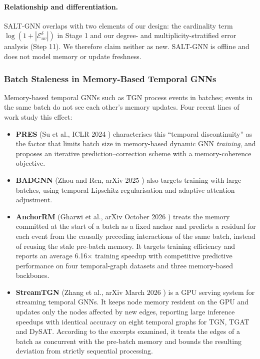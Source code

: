 \documentclass[11pt,a4paper]{article}
\begin{document}
\paragraph{Relationship and differentiation.} SALT-GNN overlaps with two elements of our design: the cardinality term $\log(1+|\mathcal{E}^{\delta}_{uv}|)$ in Stage 1 and our degree- and multiplicity-stratified error analysis (Step 11). We therefore claim neither as new. SALT-GNN is offline and does not model memory or update freshness.

\subsubsection{Batch Staleness in Memory-Based Temporal GNNs}
\label{sec:staleness_work}
Memory-based temporal GNNs such as TGN \cite{rossi2020tgn} process events in batches; events in the same batch do not see each other's memory updates. Four recent lines of work study this effect:
\begin{itemize}[leftmargin=*]
    \item \textbf{PRES} (Su et al., ICLR 2024 \cite{su2024pres}) characterises this ``temporal discontinuity'' as the factor that limits batch size in memory-based dynamic GNN \emph{training}, and proposes an iterative prediction--correction scheme with a memory-coherence objective.
    \item \textbf{BADGNN} (Zhou and Ren, arXiv 2025 \cite{zhou2025badgnn}) also targets training with large batches, using temporal Lipschitz regularisation and adaptive attention adjustment.
    \item \textbf{AnchorRM} (Gharwi et al., arXiv October 2026 \cite{anchorrm2026}) treats the memory committed at the start of a batch as a fixed anchor and predicts a residual for each event from the causally preceding interactions of the same batch, instead of reusing the stale pre-batch memory. It targets training efficiency and reports an average 6.16$\times$ training speedup with competitive predictive performance on four temporal-graph datasets and three memory-based backbones.
    \item \textbf{StreamTGN} (Zhang et al., arXiv March 2026 \cite{streamtgn2026}) is a GPU serving system for streaming temporal GNNs. It keeps node memory resident on the GPU and updates only the nodes affected by new edges, reporting large inference speedups with identical accuracy on eight temporal graphs for TGN, TGAT and DySAT. According to the excerpts examined, it treats the edges of a batch as concurrent with the pre-batch memory and bounds the resulting deviation from strictly sequential processing.
\end{itemize}
\end{document}
